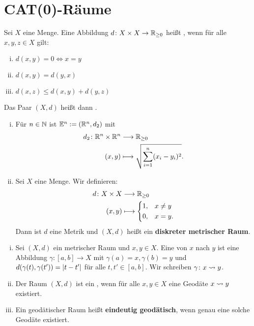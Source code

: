 \section{CAT(0)-Räume} 
\label{cha:1}

\begin{definition}
\label{def:1.1}
	Sei $X$ eine Menge.
	Eine Abbildung $d \colon X \times X \rightarrow \mathbb{R}_{\geq 0}$ heißt , wenn für alle $x,y,z \in X$ gilt:
	\begin{enumerate}[(i)]
		\item $d(x,y) = 0 \Leftrightarrow x=y$
		\item $d(x,y) = d(y,x)$
		\item $d(x,z) \leq d(x,y) + d(y,z)$
	\end{enumerate}
	Das Paar $(X,d)$ heißt dann .
\end{definition}

\begin{beispiel}
\label{bsp:1.2}
	\begin{enumerate}[(i)]
		\item Für $n \in \mathbb{N}$ ist $\mathbb{E}^n := (\mathbb{R}^n,d_2)$ mit
		\begin{align*}
			d_2\colon \mathbb{R}^n \times \mathbb{R}^n &\longrightarrow \mathbb{R}_{\geq 0} \\
			(x,y) &\longmapsto \sqrt{\sum_{i=1}^{n} (x_i-y_i)^2}.
		\end{align*}
		\item Sei $X$ eine Menge.
		Wir definieren:
		\begin{align*}
			d\colon X \times X &\longrightarrow \mathbb{R}_{\geq 0} \\
			(x,y) &\longmapsto \begin{dcases}
				1, & x \neq y \\
				0, & x = y.
			\end{dcases}
		\end{align*}
		Dann ist $d$ eine Metrik und $(X,d)$ heißt ein \textbf{diskreter metrischer Raum}. 
	\end{enumerate}
\end{beispiel}

\begin{definition}
\label{def:1.3}
	\begin{enumerate}[(i)]
		\item Sei $(X,d)$ ein metrischer Raum und $x,y \in X$.
		Eine  von $x$ nach $y$ ist eine Abbildung $\gamma \colon [a,b] \rightarrow X$ mit $\gamma(a) = x, \gamma(b) = y$ und $d(\gamma(t),\gamma(t')) = \left\lvert t-t'\right\rvert$ für alle $t,t' \in [a,b]$.
		Wir schreiben $\gamma\colon x \rightsquigarrow y$.
		\item Der Raum $(X,d)$ ist ein , wenn für alle $x,y \in X$ eine Geodäte $x \rightsquigarrow y$ existiert.
		\item Ein geodätischer Raum heißt \textbf{eindeutig geodätisch}, wenn genau eine solche Geodäte existiert. 
	\end{enumerate}
\end{definition}

